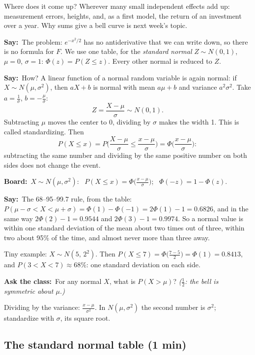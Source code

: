 \documentclass[11pt,a4paper,parskip=half]{scrartcl}
\renewcommand{\needspace}[1]{\Needspace{6\baselineskip}}
\newcommand{\say}{\textbf{\color{teal}Say:}\ }
\newcommand{\board}{\textbf{\color{gold}Board:}\ }
\newcommand{\ask}{\textbf{\color{navy}Ask the class:}\ }
\begin{document}
Where does it come up? Wherever many small independent effects add up:
measurement errors, heights, and, as a first model, the return of an
investment over a year. Why sums give a bell curve is next week's topic.

\say The problem: $e^{-x^2/2}$ has no antiderivative that we can write
down, so there is no formula for $F$. We use one table, for the
\emph{standard normal} $Z\sim N(0,1)$, $\mu=0$, $\sigma=1$:
$\Phi(z)=P(Z\le z)$. Every other normal is reduced to $Z$.

\say How? A linear function of a normal random variable is again normal:
if $X\sim N(\mu,\sigma^2)$, then $aX+b$ is normal with mean $a\mu+b$ and
variance $a^2\sigma^2$. Take $a=\frac1\sigma$, $b=-\frac\mu\sigma$:
\[ Z=\frac{X-\mu}{\sigma}\sim N(0,1). \]
Subtracting $\mu$ moves the center to 0, dividing by $\sigma$ makes the
width 1. This is called standardizing. Then
\[ P(X\le x)=P\Big(\frac{X-\mu}{\sigma}\le\frac{x-\mu}{\sigma}\Big)
	=\Phi\Big(\frac{x-\mu}{\sigma}\Big): \]
subtracting the same number and dividing by the same positive number on
both sides does not change the event.

\board $X\sim N(\mu,\sigma^2)$: \ $P(X\le x)=\Phi\big(\frac{x-\mu}{\sigma}\big)$;
\ $\Phi(-z)=1-\Phi(z)$.

\say The 68--95--99.7 rule, from the table:
$P(\mu-\sigma<X<\mu+\sigma)=\Phi(1)-\Phi(-1)=2\Phi(1)-1=0.6826$, and in
the same way $2\Phi(2)-1=0.9544$ and $2\Phi(3)-1=0.9974$. So a normal
value is within one standard deviation of the mean about two times out of
three, within two about 95\% of the time, and almost never more than
three away.

Tiny example: $X\sim N(5,\,2^2)$. Then
$P(X\le7)=\Phi\big(\frac{7-5}{2}\big)=\Phi(1)=0.8413$, and
$P(3<X<7)\approx68\%$: one standard deviation on each side.

\ask For any normal $X$, what is $P(X>\mu)$? \emph{($\tfrac12$: the bell
is symmetric about $\mu$.)}

\begin{mistake}
	Dividing by the variance: $\frac{x-\mu}{\sigma^2}$. In $N(\mu,\sigma^2)$
	the second number is $\sigma^2$; standardize with $\sigma$, its square
	root.
\end{mistake}

\needspace{0.45\textheight}
\subsection{The standard normal table (1 min)}
\end{document}
